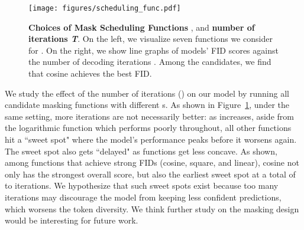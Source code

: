 \begin{figure}[!t]
    \centering
\texttt{[image: figures/scheduling\_func.pdf]}
    \vspace{-6mm}
    \caption{\textbf{Choices of Mask Scheduling Functions} , and 
    \textbf{number of iterations \textit{T}}. On the left, we visualize seven functions we consider for . On the right, we show line graphs of models' FID scores against the number of decoding iterations . Among the candidates, we find that cosine achieves the best FID.}
    \label{fig:scheduling}
    \vspace{-3mm}
\end{figure} 
We study the effect of the number of iterations () on our model by running all candidate masking functions with different s. As shown in Figure~\ref{fig:scheduling}, under the same setting, more iterations are not necessarily better: as  increases, aside from the logarithmic function which performs poorly throughout, all other functions hit a ``sweet spot" where the model's performance peaks before it worsens again. The sweet spot also gets ``delayed" as functions get less concave. As shown, among functions that achieve strong FIDs (\ie cosine, square, and linear), cosine not only has the strongest overall score, but also the earliest sweet spot at a total of  to  iterations.
We hypothesize that such sweet spots exist because too many iterations may discourage the model from keeping less confident predictions, which worsens the token diversity. We think further study on the masking design would be interesting for future work.
